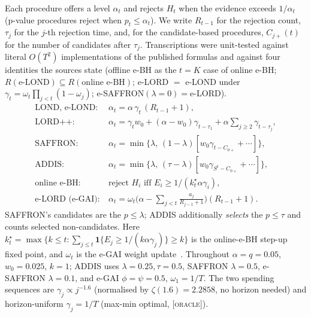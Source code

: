 \documentclass[conference]{IEEEtran}
\newcommand{\alphat}{\alpha_t}
\newcommand{\oracle}{\textsc{[oracle]}}
\begin{document}
Each procedure offers a level $\alphat$ and rejects $H_t$ when the evidence exceeds $1/\alphat$
(p-value procedures reject when $p_t\le\alphat$). We write $R_{t-1}$ for the rejection count,
$\tau_j$ for the $j$-th rejection time, and, for the candidate-based procedures, $C_{j+}(t)$ for
the number of candidates after $\tau_j$. Transcriptions were unit-tested against literal $O(T^2)$
implementations of the published formulas and against four identities the sources state
(offline e-BH as the $t=K$ case of online e-BH; $R(\text{e-LOND})\subseteq R(\text{online e-BH})$;
e-LORD $=$ e-LOND under $\gamma_t=\omega_t\prod_{j<t}(1-\omega_j)$; e-SAFFRON$(\lambda{=}0)=$e-LORD).
{\small\begin{align*}
\text{LOND, e-LOND:}\ &\alphat=\alpha\,\gamma_t\,(R_{t-1}+1),\\
\text{LORD++:}\ &\alphat=\gamma_t w_0+(\alpha-w_0)\gamma_{t-\tau_1}+\alpha\!\sum_{j\ge2}\gamma_{t-\tau_j},\\
\text{SAFFRON:}\ &\alphat=\min\big\{\lambda,\,(1-\lambda)[w_0\gamma_{t-C_{0+}}+\cdots]\big\},\\
\text{ADDIS:}\ &\alphat=\min\big\{\lambda,\,(\tau-\lambda)[w_0\gamma_{S^t-C_{0+}}+\cdots]\big\},\\
\text{online e-BH:}\ &\text{reject } H_i \text{ iff } E_i\ge 1/(k^\star_t\alpha\gamma_i),\\
\text{e-LORD (e-GAI):}\ &\alphat=\omega_t\big(\alpha-\textstyle\sum_{j<t}\tfrac{a_j}{R_{j-1}+1}\big)(R_{t-1}+1).
\end{align*}}%
SAFFRON's candidates are the $p\le\lambda$; ADDIS additionally \emph{selects} the $p\le\tau$ and
counts selected non-candidates. Here $k^\star_t=\max\{k\le t:\sum_{j\le t}\mathbf{1}\{E_j\ge
1/(k\alpha\gamma_j)\}\ge k\}$ is the online-e-BH step-up fixed point, and $\omega_t$ is the e-GAI
weight update~\cite{egai2025}.
Throughout $\alpha=q=0.05$, $w_0=0.025$, $k=1$; ADDIS uses $\lambda=0.25,\tau=0.5$, SAFFRON
$\lambda=0.5$, e-SAFFRON $\lambda=0.1$, and e-GAI $\phi=\psi=0.5$, $\omega_1=1/T$. The two spending
sequences are $\gamma_j\propto j^{-1.6}$ (normalised by $\zeta(1.6)=2.2858$, no horizon needed) and
horizon-uniform $\gamma_j=1/T$ (max-min optimal, \oracle).
\end{document}
